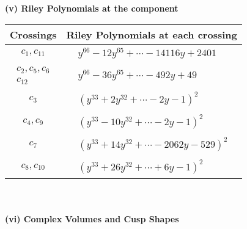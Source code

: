 \documentclass[1p]{elsarticle_modified}
\theoremstyle{definition}
\begin{document}
\newpage\renewcommand{\arraystretch}{1}
\flushleft \textbf{(v) Riley Polynomials at the component}\newline \\
\begin{tabular}{m{50pt}|m{274pt}}
Crossings & \hspace{64pt}Riley Polynomials at each crossing \\
\hline $$\begin{aligned}c_{1},c_{11}\end{aligned}$$&$\begin{aligned}
&y^{66}-12 y^{65}+\cdots-14116 y+2401
\end{aligned}$\\
\hline $$\begin{aligned}c_{2},c_{5},c_{6}\\c_{12}\end{aligned}$$&$\begin{aligned}
&y^{66}-36 y^{65}+\cdots-492 y+49
\end{aligned}$\\
\hline $$\begin{aligned}c_{3}\end{aligned}$$&$\begin{aligned}
&(y^{33}+2 y^{32}+\cdots-2 y-1)^{2}
\end{aligned}$\\
\hline $$\begin{aligned}c_{4},c_{9}\end{aligned}$$&$\begin{aligned}
&(y^{33}-10 y^{32}+\cdots-2 y-1)^{2}
\end{aligned}$\\
\hline $$\begin{aligned}c_{7}\end{aligned}$$&$\begin{aligned}
&(y^{33}+14 y^{32}+\cdots-2062 y-529)^{2}
\end{aligned}$\\
\hline $$\begin{aligned}c_{8},c_{10}\end{aligned}$$&$\begin{aligned}
&(y^{33}+26 y^{32}+\cdots+6 y-1)^{2}
\end{aligned}$\\
\hline
\end{tabular}\\~\\
\newpage\flushleft \textbf{(vi) Complex Volumes and Cusp Shapes}
\end{document}
